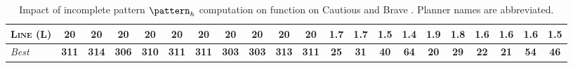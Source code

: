 \begin{table}[tb]
{\begin{tabular}{|l||cccccccccc||cccccccccc||}
\textsc{Line} (L)&\textbf{20}&\textbf{20}&\textbf{20}&\textbf{20}&\textbf{20}&\textbf{20}&\textbf{20}&\textbf{20}&\textbf{20}&\textbf{20}&1.7&1.7&1.5&\textbf{1.4}&1.9&1.8&1.6&1.6&1.6&1.5
\\\hline
\textit{Best}&\textbf{311}&\textbf{314}&\textbf{306}&\textbf{310}&\textbf{311}&\textbf{311}&\textbf{303}&\textbf{303}&\textbf{313}&\textbf{311}&\textbf{25}&\textbf{31}&\textbf{40}&\textbf{64}&\textbf{20}&\textbf{29}&\textbf{22}&\textbf{21}&\textbf{54}&\textbf{46}\\\hline

        \end{tabular}}
        \caption{Impact of incomplete pattern $\pattern_h$ computation on function on Cautious and Brave \pattyd. Planner names are abbreviated.}
        \label{tab:abl-patternh-incomplete}
        \end{table}
        